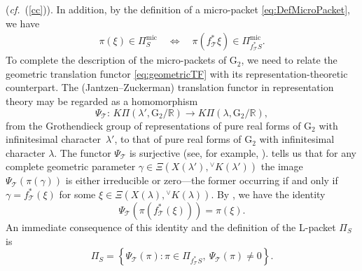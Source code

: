 \documentclass[a4paper, 11pt]{article}
\begin{document}
(\emph{cf.}~(\ref{cc})).
In addition, by the definition of a micro-packet
\eqref{eq:DefMicroPacket}, we have 
\begin{eqnarray}\label{eq:singularmicpacketrelation}
\pi(\xi)\in\Pi_{S}^{\mathrm{mic}}
\quad \Longleftrightarrow\quad 
\pi(f^{*}_{\mathcal{T}}\xi)\in\Pi_{f^{*}_{\mathcal{T}}S}^{\mathrm{mic}}.
\end{eqnarray}
To complete the description of the micro-packets of
\(\mathrm{G}_{2}\), we need to relate the geometric translation
functor \eqref{eq:geometricTF} with its representation-theoretic
counterpart. The (Jantzen–Zuckerman) translation functor in
representation theory  may be regarded as a homomorphism 
$$  \Psi_{\mathcal{T}}:\, K \Pi\left(\lambda',
  \mathrm{G}_{2}/\mathbb{R} \right)
  \longrightarrow K \Pi\left(\lambda,
  \mathrm{G}_{2}/\mathbb{R}\right),$$
from the Grothendieck group of  representations of pure real forms of
$\mathrm{G}_{2}$ with infinitesimal character~$\lambda'$, to that of
pure real forms of $\mathrm{G}_{2}$ with infinitesimal
character $\lambda$.  
The functor $\Psi_{\mathcal{T}}$ is surjective (see, for example,
\cite[Corollary 17.9.8]{AvLTV}).  \cite[Proposition 16.4(b)]{ABV}
tells us that  for any complete geometric parameter \(\gamma \in
\Xi(X(\lambda'), {}^{\vee}K(\lambda'))\) the image
\(\Psi_{\mathcal{T}}(\pi(\gamma))\) is either irreducible or zero—the
former occurring if and only if \(\gamma = f^{\ast}_\mathcal{T}(\xi)\)
for some \(\xi \in \Xi(X(\lambda), {}^{\vee}K(\lambda))\).
By \cite[Proposition 16.6]{ABV}, we have the identity
\begin{equation}\label{eq:SingularPimic}
\Psi_{\mathcal{T}} \left(\pi(f^{\ast}_\mathcal{T}(\xi)) \right) = \pi(\xi).
\end{equation}
An immediate consequence of this identity and the definition of the
L-packet $\Pi_{S}$ is
\begin{equation}
\label{lpackettrans}
\Pi_{S} = \left\{ \Psi_{\mathcal{T}}(\pi) : \pi \in
\Pi_{f_{\mathcal{T}}^{*} S}, \ \Psi_{\mathcal{T}}(\pi) \neq 0 \right\}.
\end{equation}
\end{document}
